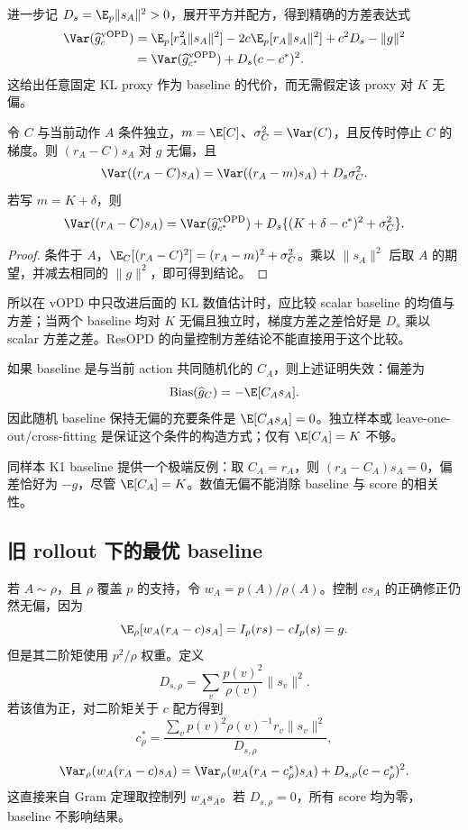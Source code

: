 进一步记 $D_s=\E_p\lVert s_A\rVert^2>0$，展开平方并配方，得到精确的方差表达式
\begin{align*}
 \Var(\widehat g_c^{\mathrm{vOPD}})
 &=\E_p[r_A^2\lVert s_A\rVert^2]
   -2c\E_p[r_A\lVert s_A\rVert^2]+c^2D_s-\lVert g\rVert^2\\
 &=\Var(\widehat g_{c^*}^{\mathrm{vOPD}})+D_s(c-c^*)^2.
\end{align*}
这给出任意固定 KL proxy 作为 baseline 的代价，而无需假定该 proxy 对 $K$ 无偏。

\begin{proposition}
令 $C$ 与当前动作 $A$ 条件独立，$m=\E[C]$、$\sigma_C^2=\Var(C)$，且反传时停止 $C$ 的梯度。则 $(r_A-C)s_A$ 对 $g$ 无偏，且
\[
 \Var((r_A-C)s_A)
 =\Var((r_A-m)s_A)+D_s\sigma_C^2.
\]
若写 $m=K+\delta$，则
\[
 \Var((r_A-C)s_A)
 =\Var(\widehat g_{c^*}^{\mathrm{vOPD}})
  +D_s\{(K+\delta-c^*)^2+\sigma_C^2\}.
\]
\end{proposition}

\begin{proof}
条件于 $A$，$\E_C[(r_A-C)^2]=(r_A-m)^2+\sigma_C^2$。乘以 $\lVert s_A\rVert^2$ 后取 $A$ 的期望，并减去相同的 $\lVert g\rVert^2$，即可得到结论。
\end{proof}

所以在 vOPD 中只改进后面的 KL 数值估计时，应比较 scalar baseline 的均值与方差；当两个 baseline 均对 $K$ 无偏且独立时，梯度方差之差恰好是 $D_s$ 乘以 scalar 方差之差。ResOPD 的向量控制方差结论不能直接用于这个比较。

如果 baseline 是与当前 action 共同随机化的 $C_A$，则上述证明失效：偏差为
\begin{equation}
 \operatorname{Bias}(\widehat g_C)=-\E[C_As_A].
 \label{eq:chapter3-random-baseline-bias}
\end{equation}
因此随机 baseline 保持无偏的充要条件是 $\E[C_As_A]=0$。独立样本或 leave-one-out/cross-fitting 是保证这个条件的构造方式；仅有 $\E[C_A]=K$ 不够。

同样本 K1 baseline 提供一个极端反例：取 $C_A=r_A$，则 $(r_A-C_A)s_A=0$，偏差恰好为 $-g$，尽管 $\E[C_A]=K$。数值无偏不能消除 baseline 与 score 的相关性。

\subsection{旧 rollout 下的最优 baseline}

若 $A\sim\rho$，且 $\rho$ 覆盖 $p$ 的支持，令 $w_A=p(A)/\rho(A)$。控制 $c s_A$ 的正确修正仍然无偏，因为
\[
 \E_\rho[w_A(r_A-c)s_A]=I_p(rs)-cI_p(s)=g.
\]
但是其二阶矩使用 $p^2/\rho$ 权重。定义
\[
 D_{s,\rho}=\sum_v\frac{p(v)^2}{\rho(v)}\|s_v\|^2.
\]
若该值为正，对二阶矩关于 $c$ 配方得到
\[
 c_\rho^*=
 \frac{\sum_v p(v)^2\rho(v)^{-1}r_v\|s_v\|^2}{D_{s,\rho}},
\]
\[
 \Var_\rho(w_A(r_A-c)s_A)
 =\Var_\rho(w_A(r_A-c_\rho^*)s_A)
  +D_{s,\rho}(c-c_\rho^*)^2.
\]
这直接来自 Gram 定理取控制列 $w_As_A$。若 $D_{s,\rho}=0$，所有 score 均为零，baseline 不影响结果。

